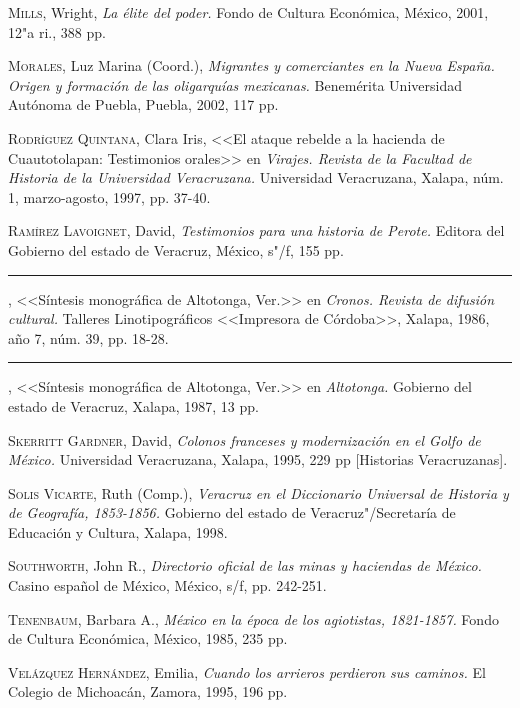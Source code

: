 \documentclass[14pt,twoside,final]{extbook} %
\begin{document}
\textsc{Mills}, Wright, \emph{La élite del poder.} Fondo de Cultura Económica, México, 2001, 12"a ri., 388 pp.

\textsc{Morales}, Luz Marina (Coord.), \emph{Migrantes y comerciantes en la Nueva España. Origen y formación de las oligarquías mexicanas.} Benemérita Universidad Autónoma de Puebla, Puebla, 2002, 117 pp.

\textsc{Rodríguez Quintana}, Clara Iris, <<El ataque rebelde a la hacienda de Cuautotolapan: Testimonios orales>> en \emph{Virajes. Revista de la Facultad de Historia de la Universidad Veracruzana.} Universidad Veracruzana, Xalapa, núm. 1, marzo-agosto, 1997, pp. 37-40.

\textsc{Ramírez Lavoignet}, David, \emph{Testimonios para una historia de Perote.} Editora del Gobierno del estado de Veracruz, México, s"/f, 155 pp.

\rule{1cm}{0.4pt}, <<Síntesis monográfica de Altotonga, Ver.>> en \emph{Cronos. Revista de difusión cultural.} Talleres Linotipográficos <<Impresora de Córdoba>>, Xalapa, 1986,
año 7, núm. 39, pp. 18-28.

\rule{1cm}{0.4pt}, <<Síntesis monográfica de Altotonga, Ver.>> en \emph{Altotonga.} Gobierno del estado de Veracruz, Xalapa, 1987, 13 pp.

\textsc{Skerritt Gardner}, David, \emph{Colonos franceses y modernización en el Golfo de México.} Universidad Veracruzana, Xalapa, 1995, 229 pp [Historias Veracruzanas].

\textsc{Solis Vicarte}, Ruth (Comp.), \emph{Veracruz en el Diccionario Universal de Historia y de Geografía, 1853-1856.} Gobierno del estado de Veracruz"/Secretaría de Educación y Cultura, Xalapa, 1998.

\textsc{Southworth}, John R., \emph{Directorio oficial de las minas y haciendas de México.} Casino español de México, México, s/f, pp. 242-251.

\textsc{Tenenbaum}, Barbara A., \emph{México en la época de los agiotistas, 1821-1857.} Fondo de Cultura Económica, México, 1985, 235 pp.

\textsc{Velázquez Hernández}, Emilia, \emph{Cuando los arrieros perdieron sus caminos.} El Colegio de Michoacán, Zamora, 1995, 196 pp.
\appendix
\end{document}
